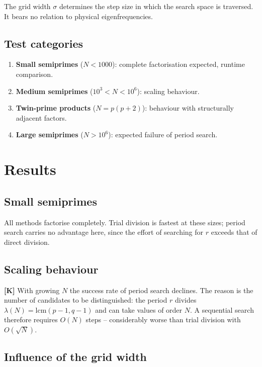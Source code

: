 The grid width $\sigma$ determines the step size in which the search space is
traversed. It bears no relation to physical eigenfrequencies.

\subsection{Test categories}

\begin{enumerate}
  \item \textbf{Small semiprimes} ($N < 1000$): complete factorisation
    expected, runtime comparison.
  \item \textbf{Medium semiprimes} ($10^3 < N < 10^6$): scaling behaviour.
  \item \textbf{Twin-prime products} ($N = p(p+2)$): behaviour with
    structurally adjacent factors.
  \item \textbf{Large semiprimes} ($N > 10^6$): expected failure of period
    search.
\end{enumerate}

\section{Results}

\subsection{Small semiprimes}

All methods factorise completely. Trial division is fastest at these sizes;
period search carries no advantage here, since the effort of searching for $r$
exceeds that of direct division.

\subsection{Scaling behaviour}

\textbf{[K]} With growing $N$ the success rate of period search declines. The
reason is the number of candidates to be distinguished: the period $r$ divides
$\lambda(N) = \mathrm{lcm}(p-1,q-1)$ and can take values of order $N$. A
sequential search therefore requires $O(N)$ steps -- considerably worse than
trial division with $O(\sqrt{N})$.

\subsection{Influence of the grid width}


